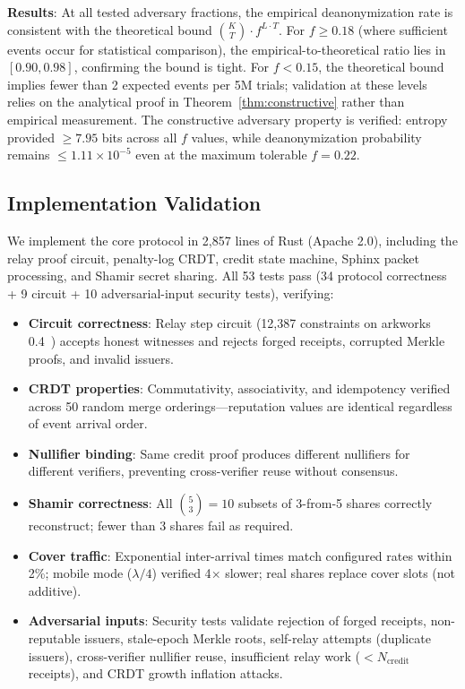 \documentclass[11pt,a4paper]{article}
\begin{document}
\textbf{Results}: At all tested adversary fractions, the empirical deanonymization rate is consistent with the theoretical bound $\binom{K}{T} \cdot f^{L \cdot T}$. For $f \geq 0.18$ (where sufficient events occur for statistical comparison), the empirical-to-theoretical ratio lies in $[0.90, 0.98]$, confirming the bound is tight. For $f < 0.15$, the theoretical bound implies fewer than 2 expected events per 5M trials; validation at these levels relies on the analytical proof in Theorem~\ref{thm:constructive} rather than empirical measurement. The constructive adversary property is verified: entropy provided $\geq 7.95$ bits across all $f$ values, while deanonymization probability remains $\leq 1.11 \times 10^{-5}$ even at the maximum tolerable $f = 0.22$.

\subsection{Implementation Validation}

We implement the core protocol in 2,857 lines of Rust (Apache 2.0), including the relay proof circuit, penalty-log CRDT, credit state machine, Sphinx packet processing, and Shamir secret sharing. All 53 tests pass (34 protocol correctness + 9 circuit + 10 adversarial-input security tests), verifying:

\begin{itemize}[nosep]
    \item \textbf{Circuit correctness}: Relay step circuit (12,387 constraints on arkworks 0.4~\cite{arkworks}) accepts honest witnesses and rejects forged receipts, corrupted Merkle proofs, and invalid issuers.
    \item \textbf{CRDT properties}: Commutativity, associativity, and idempotency verified across 50 random merge orderings---reputation values are identical regardless of event arrival order.
    \item \textbf{Nullifier binding}: Same credit proof produces different nullifiers for different verifiers, preventing cross-verifier reuse without consensus.
    \item \textbf{Shamir correctness}: All $\binom{5}{3} = 10$ subsets of 3-from-5 shares correctly reconstruct; fewer than 3 shares fail as required.
    \item \textbf{Cover traffic}: Exponential inter-arrival times match configured rates within 2\%; mobile mode ($\lambda/4$) verified 4$\times$ slower; real shares replace cover slots (not additive).
    \item \textbf{Adversarial inputs}: Security tests validate rejection of forged receipts, non-reputable issuers, stale-epoch Merkle roots, self-relay attempts (duplicate issuers), cross-verifier nullifier reuse, insufficient relay work ($< N_{\text{credit}}$ receipts), and CRDT growth inflation attacks.
\end{itemize}
\end{document}
